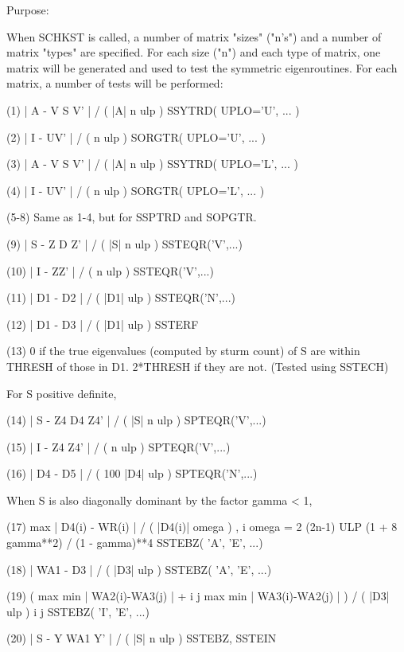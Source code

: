 \begin{DoxyParagraph}{Purpose\+: }
\begin{DoxyVerb}
 When SCHKST is called, a number of matrix "sizes" ("n's") and a
 number of matrix "types" are specified.  For each size ("n")
 and each type of matrix, one matrix will be generated and used
 to test the symmetric eigenroutines.  For each matrix, a number
 of tests will be performed:

 (1)     | A - V S V' | / ( |A| n ulp ) SSYTRD( UPLO='U', ... )

 (2)     | I - UV' | / ( n ulp )        SORGTR( UPLO='U', ... )

 (3)     | A - V S V' | / ( |A| n ulp ) SSYTRD( UPLO='L', ... )

 (4)     | I - UV' | / ( n ulp )        SORGTR( UPLO='L', ... )

 (5-8)   Same as 1-4, but for SSPTRD and SOPGTR.

 (9)     | S - Z D Z' | / ( |S| n ulp ) SSTEQR('V',...)

 (10)    | I - ZZ' | / ( n ulp )        SSTEQR('V',...)

 (11)    | D1 - D2 | / ( |D1| ulp )        SSTEQR('N',...)

 (12)    | D1 - D3 | / ( |D1| ulp )        SSTERF

 (13)    0 if the true eigenvalues (computed by sturm count)
         of S are within THRESH of
         those in D1.  2*THRESH if they are not.  (Tested using
         SSTECH)

 For S positive definite,

 (14)    | S - Z4 D4 Z4' | / ( |S| n ulp ) SPTEQR('V',...)

 (15)    | I - Z4 Z4' | / ( n ulp )        SPTEQR('V',...)

 (16)    | D4 - D5 | / ( 100 |D4| ulp )       SPTEQR('N',...)

 When S is also diagonally dominant by the factor gamma < 1,

 (17)    max | D4(i) - WR(i) | / ( |D4(i)| omega ) ,
          i
         omega = 2 (2n-1) ULP (1 + 8 gamma**2) / (1 - gamma)**4
                                              SSTEBZ( 'A', 'E', ...)

 (18)    | WA1 - D3 | / ( |D3| ulp )          SSTEBZ( 'A', 'E', ...)

 (19)    ( max { min | WA2(i)-WA3(j) | } +
            i     j
           max { min | WA3(i)-WA2(j) | } ) / ( |D3| ulp )
            i     j
                                              SSTEBZ( 'I', 'E', ...)

 (20)    | S - Y WA1 Y' | / ( |S| n ulp )  SSTEBZ, SSTEIN


\end{DoxyVerb}
\end{DoxyParagraph}
